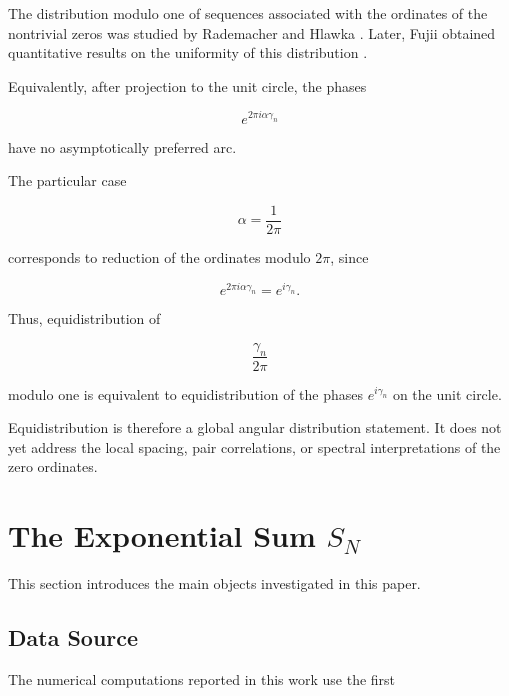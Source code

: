 \documentclass[11pt]{amsart}
\numberwithin{equation}{section}
\theoremstyle{plain}
\theoremstyle{definition}
\theoremstyle{remark}
\begin{document}
The distribution modulo one of sequences associated with the ordinates
of the nontrivial zeros was studied by Rademacher and Hlawka
\cite{Rademacher1956,Hlawka1975}.
Later, Fujii obtained quantitative results on the uniformity of this
distribution
\cite{Fujii1978}.

Equivalently, after projection to the unit circle, the phases

\begin{equation}
e^{2\pi i\alpha\gamma_n}
\label{eq:scaled_ordinate_phase}
\end{equation}

have no asymptotically preferred arc.

The particular case

\begin{equation}
\alpha
=
\frac{1}{2\pi}
\label{eq:two_pi_inverse_scaling}
\end{equation}

corresponds to reduction of the ordinates modulo \(2\pi\), since

\begin{equation}
e^{2\pi i\alpha\gamma_n}
=
e^{i\gamma_n}.
\label{eq:two_pi_scaling_phase_identity}
\end{equation}

Thus, equidistribution of

\begin{equation}
\frac{\gamma_n}{2\pi}
\label{eq:ordinate_mod_two_pi_sequence}
\end{equation}

modulo one is equivalent to equidistribution of the phases
\(e^{i\gamma_n}\) on the unit circle.

Equidistribution is therefore a global angular distribution statement.
It does not yet address the local spacing, pair correlations, or
spectral interpretations of the zero ordinates.


\section{The Exponential Sum $S_N$}
\label{sec:SN_definition}

This section introduces the main objects investigated in this paper.

\subsection{Data Source}
\label{subsec:data_source}

The numerical computations reported in this work use the first
\end{document}
